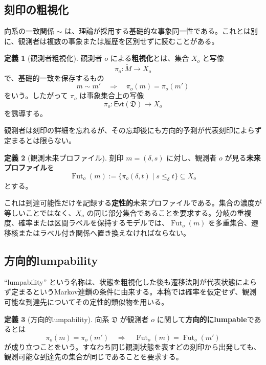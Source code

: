 \documentclass[a4paper,11pt]{ltjsarticle}
\theoremstyle{definition}
\newtheorem{definition}{定義}[section]
\theoremstyle{plain}
\newcommand{\Evt}{\mathsf{Evt}}
\newcommand{\Fut}{\operatorname{Fut}}
\begin{document}
\subsection{刻印の粗視化}

向系の一致関係 $\sim$ は、理論が採用する基礎的な事象同一性である。これとは別に、観測者は複数の事象または履歴を区別せずに読むことがある。

\begin{definition}[観測者粗視化]
観測者 $o$ による\textbf{粗視化}とは、集合 $X_o$ と写像
\begin{equation}
 \pi_o:\widetilde M\longrightarrow X_o
 \label{eq:observer-coarse-graining}
\end{equation}
で、基礎的一致を保存するもの
\[
 m\sim m'
 \quad\Longrightarrow\quad
 \pi_o(m)=\pi_o(m')
\]
をいう。したがって $\pi_o$ は事象集合上の写像
\[
 \overline\pi_o:\Evt(\mathfrak D)\longrightarrow X_o
\]
を誘導する。
\end{definition}

観測者は刻印の詳細を忘れるが、その忘却後にも方向的予測が代表刻印によらず定まるとは限らない。

\begin{definition}[観測未来プロファイル]
刻印 $m=(\delta,s)$ に対し、観測者 $o$ が見る\textbf{未来プロファイル}を
\begin{equation}
 \Fut_o(m)
 :=
 \{\pi_o(\delta,t)\mid s\leq_\delta t\}
 \subseteq X_o
 \label{eq:observed-future-profile}
\end{equation}
 とする。
\end{definition}

これは到達可能性だけを記録する\textbf{定性的}未来プロファイルである。集合の濃度が等しいことではなく、$X_o$ の同じ部分集合であることを要求する。分岐の重複度、確率または区間ラベルを保持するモデルでは、$\Fut_o(m)$ を多重集合、遷移核またはラベル付き関係へ置き換えなければならない。

\subsection{方向的lumpability}

``lumpability'' という名称は、状態を粗視化した後も遷移法則が代表状態によらず定まるというMarkov連鎖の条件に由来する\cite{KemenySnell1976}。本稿では確率を仮定せず、観測可能な到達先についてその定性的類似物を用いる。

\begin{definition}[方向的lumpability]
向系 $\mathfrak D$ が観測者 $o$ に関して\textbf{方向的にlumpable}であるとは
\begin{equation}
 \pi_o(m)=\pi_o(m')
 \quad\Longrightarrow\quad
 \Fut_o(m)=\Fut_o(m')
 \label{eq:directional-lumpability}
\end{equation}
が成り立つことをいう。すなわち同じ観測状態を表すどの刻印から出発しても、観測可能な到達先の集合が同じであることを要求する。
\end{definition}
\end{document}
